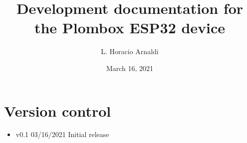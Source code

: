 \documentclass[a4paper,11pt]{article}
\begin{document}
\author{L. Horacio Arnaldi}
\title{Development documentation for the Plombox ESP32 device}
\date{March 16, 2021}
\maketitle

\begin{figure}[!h]
  \centering
  \label{fig_caja_celu}
\end{figure}

\newpage
\tableofcontents
\section{Version control}
\begin{itemize}
\item v0.1 03/16/2021 Initial release
\end{itemize}
\end{document}
